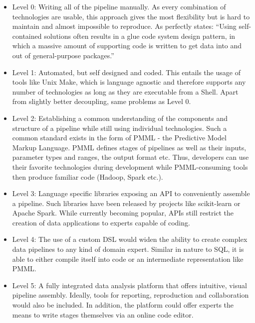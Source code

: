\begin{itemize}
	\item Level 0: Writing all of the pipeline manually. As every combination of technologies are usable, this approach gives the most flexibility but is hard to maintain and almost impossible to reproduce. As \citep{MLTechnicalDebt} perfectly states: ``Using self-contained solutions often results in a glue code system design pattern, in which a massive amount of supporting code is written to get data into and out of general-purpose packages.''
	
	\item Level 1: Automated, but self designed and coded. This entails the usage of tools like Unix Make, which is language agnostic and therefore supports any number of technologies as long as they are executable from a Shell. Apart from slightly better decoupling, same problems as Level 0.
	
	\item Level 2: Establishing a common understanding of the components and structure of a pipeline while still using individual technologies. Such a common standard exists in the form of PMML - the Predictive Model Markup Language. PMML defines stages of pipelines as well as their inputs, parameter types and ranges, the output format etc. Thus, developers can use their favorite technologies during development while PMML-consuming tools then produce familiar code (Hadoop, Spark etc.).
	
	\item Level 3: Language specific libraries exposing an API to conveniently assemble a pipeline. Such libraries have been released by projects like scikit-learn or Apache Spark. While currently becoming popular, APIs still restrict the creation of data applications to experts capable of coding.
	
	\item Level 4: The use of a custom DSL would widen the ability to create complex data pipelines to any kind of domain expert. Similar in nature to SQL, it is able to either compile itself into code or an intermediate representation like PMML.
	
	\item Level 5: A fully integrated data analysis platform that offers intuitive, visual pipeline assembly. Ideally, tools for reporting, reproduction and collaboration would also be included. In addition, the platform could offer experts the means to write stages themselves via an online code editor.
\end{itemize}

